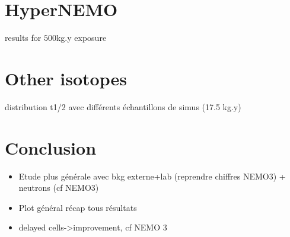 \section{HyperNEMO}
results for $500$kg.y exposure

\section{Other isotopes}

distribution t1/2 avec différents échantillons de simus (17.5 kg.y)

\section{Conclusion}
\begin{itemize}
\item Etude plus générale avec bkg externe+lab (reprendre chiffres NEMO3) + neutrons (cf NEMO3)
\item Plot général récap tous résultats
\item delayed cells->improvement, cf NEMO 3
\end{itemize}
